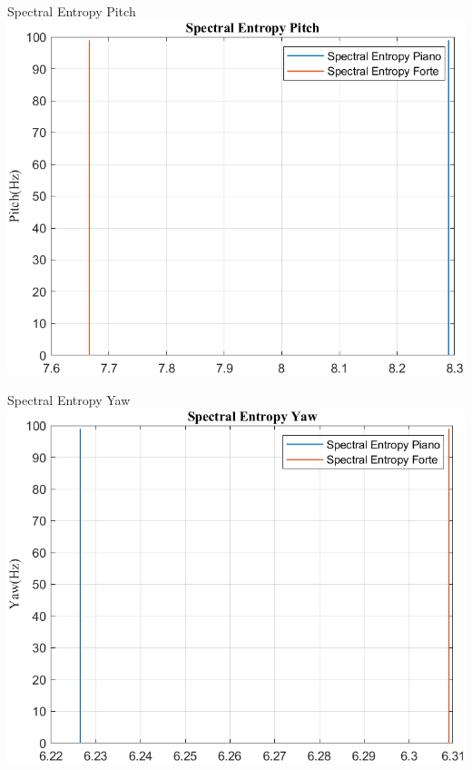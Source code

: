 	\begin{frame}{{Spectral Entropy Pitch}}
		\centering\includegraphics[height=.8\textheight]{figure/VAng/Trasformata/Spectral EntropyPitch}
	\end{frame}
	
	\begin{frame}{{Spectral Entropy Yaw}}
		\centering\includegraphics[height=.8\textheight]{figure/VAng/Trasformata/Spectral EntropyYaw}
	\end{frame}
	
